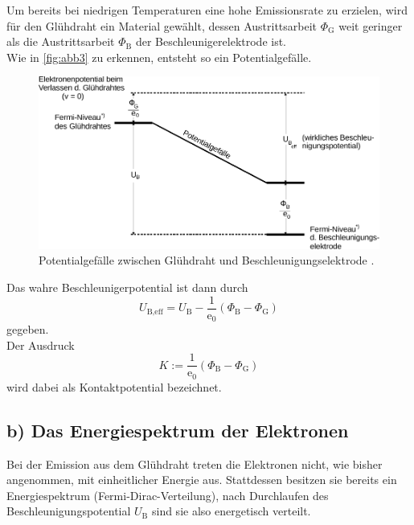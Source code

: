 Um bereits bei niedrigen Temperaturen eine hohe Emissionsrate zu erzielen, wird für den Glühdraht ein Material
gewählt, dessen Austrittsarbeit $\Phi_\text{G}$ weit geringer als die Austrittsarbeit $\Phi_\text{B}$ der
Beschleunigerelektrode ist. \\

Wie in \autoref{fig:abb3} zu erkennen, entsteht so ein Potentialgefälle.

\begin{figure}
    \centering
    \includegraphics{figures/Abb_3.pdf}
    \caption{Potentialgefälle zwischen Glühdraht und Beschleunigungselektrode \cite{ap08}.}
    \label{fig:abb3}
\end{figure}

Das wahre Beschleunigerpotential ist dann durch
\begin{equation}
    U_{\text{B},\text{eff}} = U_\text{B} - \frac{1}{\text{e}_0} (\Phi_\text{B} - \Phi_\text{G})
    \label{eq:Ueff}
\end{equation}
gegeben. \\

Der Ausdruck
\begin{equation*}
    K := \frac{1}{\text{e}_0} (\Phi_\text{B} - \Phi_\text{G})
\end{equation*}
wird dabei als Kontaktpotential bezeichnet.


\subsection*{b) Das Energiespektrum der Elektronen}

Bei der Emission aus dem Glühdraht treten die Elektronen nicht, wie bisher angenommen, mit einheitlicher Energie aus.
Stattdessen besitzen sie bereits ein Energiespektrum (Fermi-Dirac-Verteilung), nach Durchlaufen des Beschleunigungspotential $U_\text{B}$
sind sie also energetisch verteilt. \\

